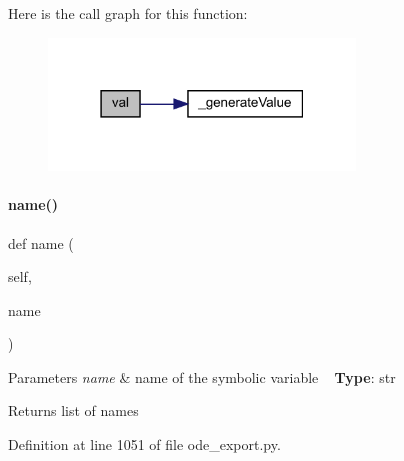 Here is the call graph for this function\+:
\nopagebreak
\begin{figure}[H]
\begin{center}
\leavevmode
\includegraphics[width=231pt]{classamici_1_1ode__export_1_1_o_d_e_model_a8d081fd7c43cbb2bce7b4eca67fb94c5_cgraph}
\end{center}
\end{figure}
\mbox{\label{classamici_1_1ode__export_1_1_o_d_e_model_a4d110acf8e52c4d48044071ea06952c0}} 
\paragraph{\texorpdfstring{name()}{name()}}
{\footnotesize\ttfamily def name (\begin{DoxyParamCaption}\item[{}]{self,  }\item[{}]{name }\end{DoxyParamCaption})}


\begin{DoxyParams}{Parameters}
{\em name} & name of the symbolic variable ~\newline
{\bfseries Type}\+: str\\
\hline
\end{DoxyParams}
\begin{DoxyReturn}{Returns}
list of names 
\end{DoxyReturn}


Definition at line 1051 of file ode\+\_\+export.\+py.

